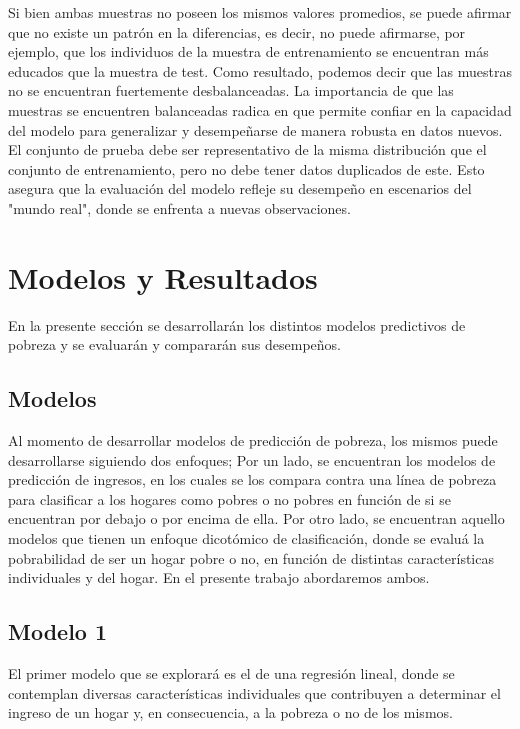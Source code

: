 \documentclass[11pt, a4paper]{article}
\begin{document}
Si bien ambas muestras no poseen los mismos valores promedios, se puede afirmar que no existe un patrón en la diferencias, es decir, no puede afirmarse, por ejemplo, que los individuos de la muestra de entrenamiento se encuentran más educados que la muestra de test. Como resultado, podemos decir que las muestras no se encuentran fuertemente desbalanceadas. La importancia de que las muestras se encuentren balanceadas radica en que permite confiar en la capacidad del modelo para generalizar y desempeñarse de manera robusta en datos nuevos.
El conjunto de prueba debe ser representativo de la misma distribución que el conjunto de entrenamiento, pero no debe tener datos duplicados de este. Esto asegura que la evaluación del modelo refleje su desempeño en escenarios del "mundo real", donde se enfrenta a nuevas observaciones.

\section{Modelos y Resultados}

En la presente sección se desarrollarán los distintos modelos predictivos de pobreza y se evaluarán y compararán sus desempeños. 

\subsection{Modelos}

Al momento de desarrollar modelos de predicción de pobreza, los mismos puede desarrollarse siguiendo dos enfoques; Por un lado, se encuentran los modelos de predicción de ingresos, en los cuales se los compara contra una línea de pobreza para clasificar a los hogares como pobres o no pobres en función de si se encuentran por debajo o por encima de ella. Por otro lado, se encuentran aquello modelos que tienen un enfoque dicotómico de clasificación, donde se evaluá la pobrabilidad de ser un hogar pobre o no, en función de distintas características individuales y del hogar. En el presente trabajo abordaremos ambos. 

\subsection*{Modelo 1}

El primer modelo que se explorará es el de una regresión lineal, donde se contemplan diversas características individuales que contribuyen a determinar el ingreso de un hogar y, en consecuencia, a la pobreza o no de los mismos. 
\end{document}
